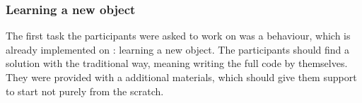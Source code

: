 \subsubsection*{Learning a new object}
The first task the participants were asked to work on was a behaviour, which is already implemented on \hobbit{}: learning a new object. The participants should find a solution with the traditional way, meaning writing the full code by themselves. They were provided with a additional materials, which should give them support to start not purely from the scratch. \\


